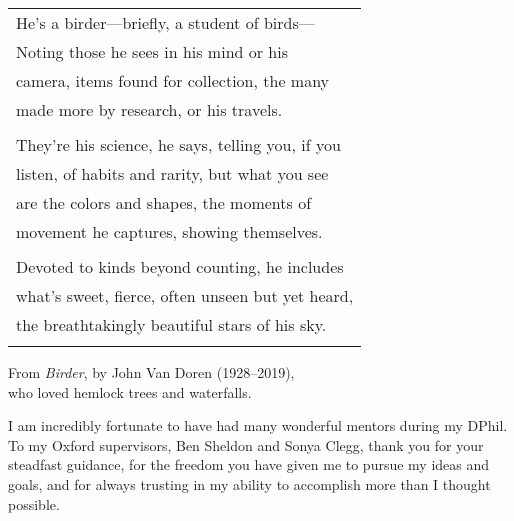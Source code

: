 \documentclass[a4paper, nobind]{templates/ociamthesis}
\begin{document}
\begin{romanpages}

\maketitle

\begin{dedication}
  \begin{center}
  
  \begin{tabular}{l}
  
  He’s a birder---briefly, a student of birds---  \\
  Noting those he sees in his mind or his  \\
  camera, items found for collection, the many\\
  made more by research, or his travels.\\\\
  
  They’re his science, he says, telling you, if you \\
  listen, of habits and rarity, but what you see \\
  are the colors and shapes, the moments of \\
  movement he captures, showing themselves. \\\\
  
  Devoted to kinds beyond counting, he includes   \\
  what’s sweet, fierce, often unseen but yet heard,  \\
  the breathtakingly beautiful stars of his sky.  \\\\
  
  \end{tabular}
  
  \vspace{200pt}
  
  From \textit{Birder}, by John Van Doren (1928--2019), \\
  who loved hemlock trees and waterfalls.
  
  \end{center}
\end{dedication}

\begin{acknowledgements}
 	I am incredibly fortunate to have had many wonderful mentors during my DPhil. To my Oxford supervisors, Ben Sheldon and Sonya Clegg, thank you for your steadfast guidance, for the freedom you have given me to pursue my ideas and goals, and for always trusting in my ability to accomplish more than I thought possible.


\end{acknowledgements}
\end{romanpages}
\end{document}

